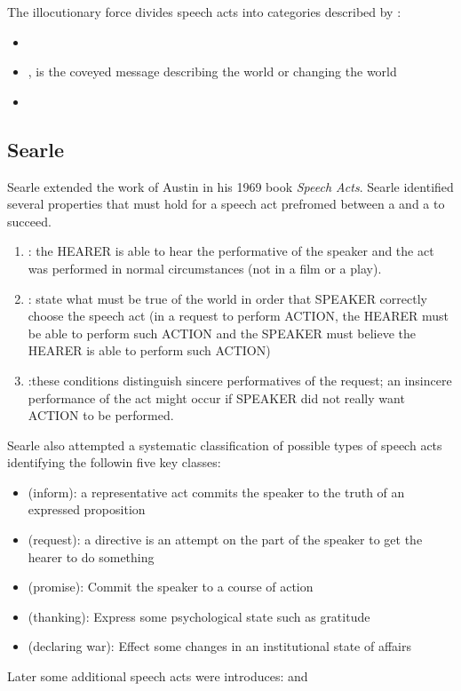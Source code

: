 The illocutionary force divides speech acts into categories described by :
\begin{itemize}
\item {} 
\item {}, is the coveyed message describing the world or changing the world
\item {}
 \end{itemize}
\subsection{Searle}

Searle extended the work of Austin in his 1969 book \emph{Speech Acts}.
Searle identified several properties that must hold for a speech act prefromed between a  and a  to succeed.
\begin{enumerate}
\item {}: the HEARER is able to hear the performative of the speaker and the act was performed in normal circumstances (not in a film or a play).
\item {}: state what must be true of the world in order that SPEAKER correctly choose the speech act (in a request to perform ACTION, the HEARER must be able to perform such ACTION and the SPEAKER must believe the HEARER is able to perform such ACTION)
\item {}:these conditions distinguish sincere performatives of the request; an insincere performance of the act might occur if SPEAKER did not really want ACTION to be performed.
\end{enumerate}

Searle also attempted a systematic classification of possible types of speech acts identifying the followin five key classes:
\begin{itemize}
\item {} (inform): a representative act commits the speaker to the truth of an expressed proposition
\item {} (request): a directive is an attempt on the part of the speaker to get the hearer to do something
\item {} (promise): Commit the speaker to a course of action
\item {} (thanking): Express some psychological state such as gratitude
\item {} (declaring war): Effect some changes in an institutional state of affairs
\end{itemize}
Later some additional speech acts were introduces:  and 

